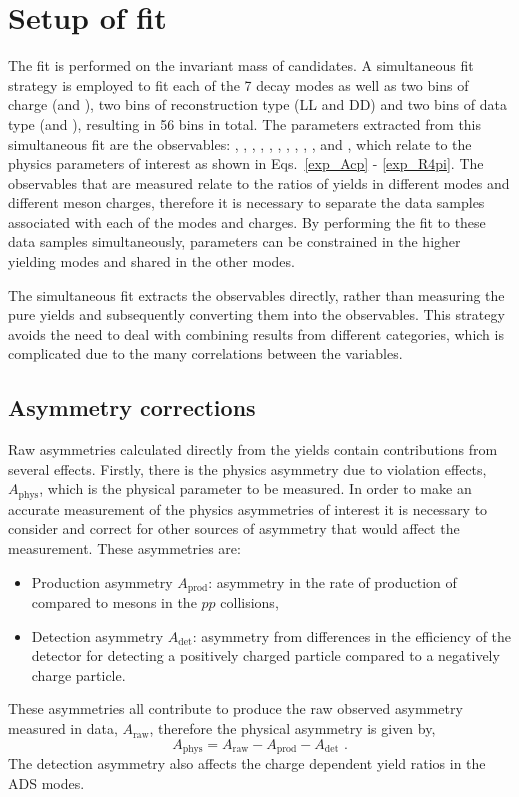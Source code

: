 \section{Setup of \CP fit}
\label{sec:cpfit:setup}

The \CP fit is performed on the invariant mass of \btodkst candidates. A simultaneous fit strategy is employed to fit each of the 7 \Dz decay modes as well as two bins of \B charge (\Bp and \Bm), two bins of \KS reconstruction type (LL and DD) and two bins of data type (\runone and \runtwo), resulting in 56 bins in total. The parameters extracted from this simultaneous fit are the \CP observables: \Akpi, \Akk, \Apipi, \Rkk, \Rpipi, \Rptwo, \Rmtwo, \Akpipipi, \Apipipipi, \Rpipipipi, \Rpfour and \Rmfour, which relate to the physics parameters of interest as shown in Eqs.~\ref{exp_Acp} - \ref{exp_R4pi}. The \CP observables that are measured relate to the ratios of yields in different \Dz modes and different \B meson charges, therefore it is necessary to separate the data samples associated with each of the modes and charges. By performing the fit to these data samples simultaneously, parameters can be constrained in the higher yielding modes and shared in the other modes.

The simultaneous fit extracts the \CP observables directly, rather than measuring the pure yields and subsequently converting them into the \CP observables. This strategy avoids the need to deal with combining results from different categories, which is complicated due to the many correlations between the variables. 

\subsection{Asymmetry corrections}
\label{sec:cpfit:asymmetries}

Raw asymmetries calculated directly from the yields contain contributions from several effects. Firstly, there is the physics asymmetry due to \CP violation effects, $A_{\text{phys}}$, which is the physical parameter to be measured. In order to make an accurate measurement of the physics asymmetries of interest it is necessary to consider and correct for other sources of asymmetry that would affect the measurement. These asymmetries are:
\begin{itemize}
\item Production asymmetry $A_{\text{prod}}$: asymmetry in the rate of production of \Bp compared to \Bm mesons in the $pp$ collisions,
\item Detection asymmetry $A_{\text{det}}$: asymmetry from differences in the efficiency of the detector for detecting a positively charged particle compared to a negatively charge particle.
\end{itemize}
These asymmetries all contribute to produce the raw observed asymmetry measured in data, $A_{\text{raw}}$, therefore the physical asymmetry is given by,
\begin{equation}
A_{\text{phys}} = A_{\text{raw}} - A_{\text{prod}} - A_{\text{det}} \text{ .}
\label{asymmetries}
\end{equation} 
The detection asymmetry also affects the charge dependent yield ratios in the ADS modes. 

